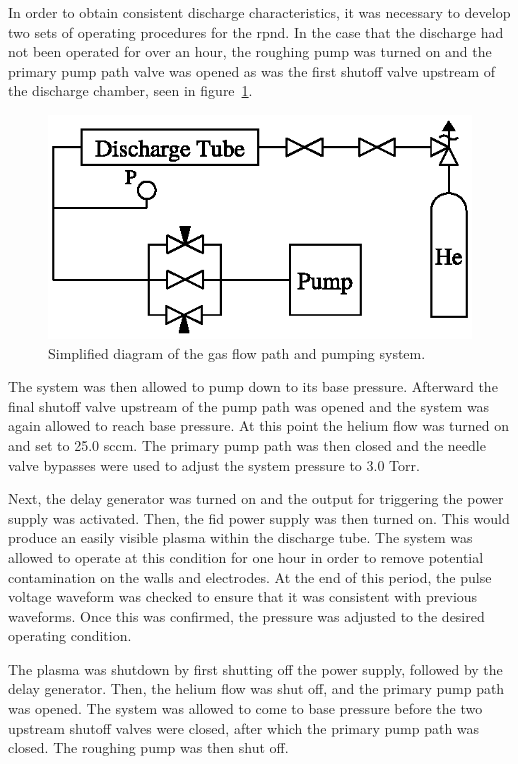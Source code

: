 In order to obtain consistent discharge characteristics, it was necessary to
develop two sets of operating procedures for the \acs{rpnd}. In the case that
the discharge had not been operated for over an hour, the roughing pump was
turned on and the primary pump path valve was opened as was the first shutoff
valve upstream of the discharge chamber, seen in figure~\ref{fig:pump}.
\begin{figure}
  \centering
  \includegraphics{./chapters/experiment/figures/pump.eps}
  \caption{Simplified diagram of the gas flow path and pumping system.}
  \label{fig:pump}
\end{figure}
The system was then allowed to pump down to its base pressure. Afterward the
final shutoff valve upstream of the pump path was opened and the system was
again allowed to reach base pressure. At this point the helium flow was turned
on and set to 25.0 sccm. The primary pump path was then closed and the needle
valve bypasses were used to adjust the system pressure to 3.0 Torr.

Next, the delay generator was turned on and the output for triggering the power
supply was activated. Then, the \acs{fid} power supply was then turned on. This
would produce an easily visible plasma within the discharge tube. The system was
allowed to operate at this condition for one hour in order to remove potential
contamination on the walls and electrodes. At the end of this period, the pulse
voltage waveform was checked to ensure that it was consistent with previous
waveforms. Once this was confirmed, the pressure was adjusted to the desired
operating condition.

The plasma was shutdown by first shutting off the power supply, followed by the
delay generator. Then, the helium flow was shut off, and the primary pump path
was opened. The system was allowed to come to base pressure before the two
upstream shutoff valves were closed, after which the primary pump path was
closed. The roughing pump was then shut off.

